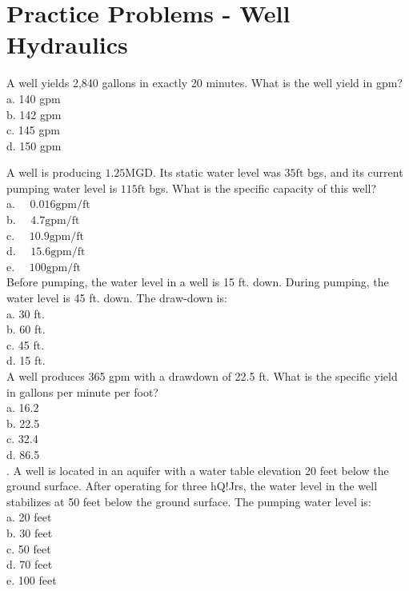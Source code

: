 \section*{Practice Problems - Well Hydraulics}


A well yields 2,840 gallons in exactly 20 minutes. What is the well yield in gpm?\\
a. 140 gpm\\
b. 142 gpm\\
c. 145 gpm\\
d. 150 gpm

A well is producing $1.25 \mathrm{MGD}$. Its static water level was $35 \mathrm{ft}$ bgs, and its current pumping water level is $115 \mathrm{ft}$ bgs. What is the specific capacity of this well?\\
a. $\quad 0.016 \mathrm{gpm} / \mathrm{ft}$\\
b. $\quad 4.7 \mathrm{gpm} / \mathrm{ft}$\\
c. $\quad 10.9 \mathrm{gpm} / \mathrm{ft}$\\
d. $\quad 15.6 \mathrm{gpm} / \mathrm{ft}$\\
e. $\quad 100 \mathrm{gpm} / \mathrm{ft}$\\

Before pumping, the water level in a well is 15 ft. down. During pumping, the water level is 45 ft. down. The draw-down is:\\
a. 30 ft.\\
b. 60 ft.\\
c. 45 ft.\\
d. 15 ft.\\

A well produces 365 gpm with a drawdown of 22.5 ft.  What is	the specific yield in gallons per minute per foot?\\
a.	16.2\\
b.	22.5\\
c.	32.4\\
d.	86.5\\

.	A well is located in an aquifer with a water table elevation 20 feet below the ground surface. After operating for three hQ!Jrs, the water level in the well stabilizes at 50 feet below the ground surface. The pumping water level is:\\
a.	20 feet\\
b.  30 feet\\
c.	50 feet\\
d.	70 feet\\
e.	100 feet\\

